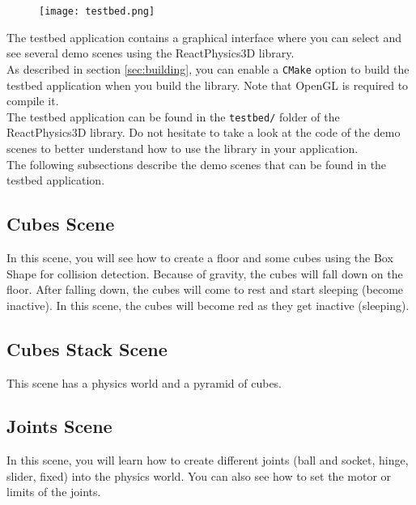 \documentclass[a4paper,12pt]{article}
\begin{document}
    \begin{figure}[!ht]
        \centering
	  \texttt{[image: testbed.png]}
        \label{fig:testbed}
    \end{figure}

    The testbed application contains a graphical interface where you can select and see several demo scenes using the ReactPhysics3D library. \\

    As described in section \ref{sec:building}, you can enable a \texttt{CMake} option to build the testbed application when you build the library.
    Note that OpenGL is required to compile it. \\

    The testbed application can be found in the \texttt{testbed/} folder of
    the ReactPhysics3D library. Do not hesitate to take a look at the code of the demo scenes to better understand how
    to use the library in your application. \\

    The following subsections describe the demo scenes that can be found in the testbed application.

    \subsection{Cubes Scene}

    In this scene, you will see how to create a floor and some cubes using the Box Shape for collision detection. Because of gravity,
    the cubes will fall down on the floor. After falling down, the cubes will come to rest and start sleeping (become inactive). In this scene,
    the cubes will become red as they get inactive (sleeping).

   \subsection{Cubes Stack Scene}

    This scene has a physics world and a pyramid of cubes.

    \subsection{Joints Scene}

    In this scene, you will learn how to create different joints (ball and socket, hinge, slider, fixed) into the physics world. You can also see how
    to set the motor or limits of the joints.
\end{document}
